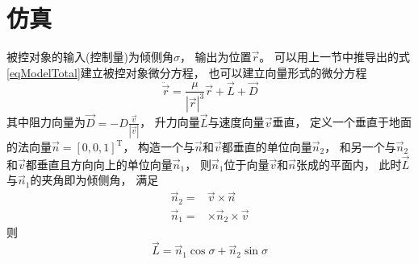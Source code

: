 \section{仿真}
被控对象的输入(控制量)为倾侧角$\sigma$，
输出为位置$\vec{r}$。
可以用上一节中推导出的式\eqref{eqModelTotal}建立被控对象微分方程，
也可以建立向量形式的微分方程
\[\ddot{\vec{r}} = \frac{\mu}{|\vec{r}|^3}\vec{r}+\vec{L}+\vec{D}\]
其中阻力向量为$\vec{D} = -D\frac{\vec{v}}{|\vec{v}|}$，
升力向量$\vec{L}$与速度向量$\vec{v}$垂直，
定义一个垂直于地面的法向量$\vec{n}=[0,0,1]^\text{T}$，
构造一个与$\vec{n}$和$\vec{v}$都垂直的单位向量$\vec{n}_2$，
和另一个与$\vec{n}_2$和$\vec{v}$都垂直且方向向上的单位向量$\vec{n}_1$，
则$\vec{n}_1$位于向量$\vec{v}$和$\vec{n}$张成的平面内，
此时$\vec{L}$与$\vec{n}_1$的夹角即为倾侧角，
满足
\begin{align*}
    \vec{n}_2 =& \vec{v}\times\vec{n} \\
    \vec{n}_1 =& \times\vec{n}_2\times\vec{v}
\end{align*}
则
\[\vec{L}=\vec{n}_1\cos\sigma + \vec{n}_2\sin\sigma\]
